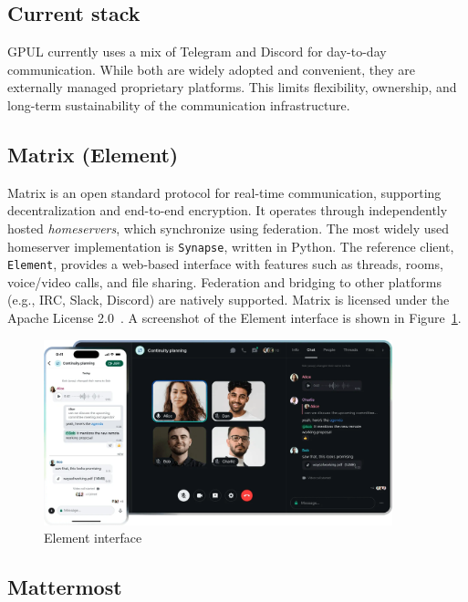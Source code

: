 \subsection*{Current stack}

GPUL currently uses a mix of Telegram and Discord for day-to-day communication. While both are widely adopted and convenient, they are externally managed proprietary platforms. This limits flexibility, ownership, and long-term sustainability of the communication infrastructure.

\subsection*{Matrix (Element)}

Matrix is an open standard protocol for real-time communication, supporting decentralization and end-to-end encryption. It operates through independently hosted \emph{homeservers}, which synchronize using federation. The most widely used homeserver implementation is \texttt{Synapse}, written in Python. The reference client, \texttt{Element}, provides a web-based interface with features such as threads, rooms, voice/video calls, and file sharing. Federation and bridging to other platforms (e.g., IRC, Slack, Discord) are natively supported. Matrix is licensed under the Apache License 2.0~\cite{matrix-docs}. A screenshot of the Element interface is shown in Figure~\ref{fig:element-ui}.

\begin{figure}[H]
  \centering
  \includegraphics[width=0.9\textwidth]{imaxes/element-ui.png}
  \caption{Element interface}
  \label{fig:element-ui}
\end{figure}

\subsection*{Mattermost}

